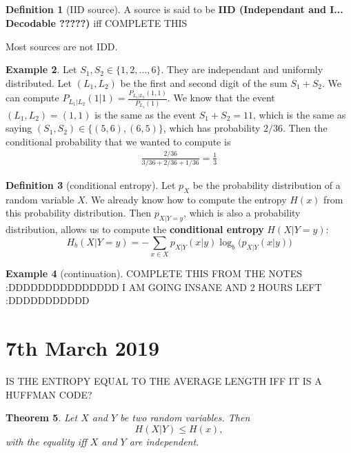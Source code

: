 \documentclass{report}
\theoremstyle{plain}
\newtheorem{thm}{Theorem}
\theoremstyle{definition}
\newtheorem{exmp}[thm]{Example}
\newtheorem{defn}[thm]{Definition}
\theoremstyle{remark}
\begin{document}
\subsection{}

\begin{defn}[IID source]
	A source is said to be \textbf{IID (Independant and I... Decodable ?????)} iff COMPLETE THIS
\end{defn}
Most sources are not IDD.

\begin{exmp}
	Let $S_1, S_2 \in \{1, 2, \ldots, 6\}$. They are independant and uniformly distributed. Let $(L_1, L_2)$ be the first and second digit of the sum $S_1 + S_2$. We can compute $P_{L_1 | L_2} (1|1) = \frac{P_{L_1 | L_2}(1, 1)}{P_{L_1}(1)}$. We know that the event $(L_1, L_2) = (1, 1)$ is the same as the event $S_1 + S_2 = 11$, which is the same as saying $(S_1, S_2) \in \{(5, 6), (6, 5)\}$, which has probability $2/36$. Then the conditional probability that we wanted to compute is
	\begin{align*}
		\frac{2/36}{3/36 + 2/36 + 1/36} = \frac13
	\end{align*}
\end{exmp}

\begin{defn}[conditional entropy]
	Let $p_X$ be the probability distribution of a random variable $X$. We already know how to compute the entropy $H(x)$ from this probability distribution. Then $p_{X|Y=y}$, which is also a probability distribution, allows us to compute the \textbf{conditional entropy} $H(X|Y=y)$:
	\begin{equation}
		H_b(X|Y=y) = - \sum_{x \in X} p_{X|Y}(x|y) \log_b \bigl(p_{X|Y}(x|y)\bigr)
	\end{equation} 	
\end{defn}

\begin{exmp}[continuation]
COMPLETE THIS FROM THE NOTES :DDDDDDDDDDDDDDD I AM GOING INSANE AND 2 HOURS LEFT :DDDDDDDDDDD
\end{exmp}

\section{7th March 2019}

IS THE ENTROPY EQUAL TO THE AVERAGE LENGTH IFF IT IS A HUFFMAN CODE?

\begin{thm}
	Let $X$ and $Y$ be two random variables. Then
	\begin{equation}
		H(X|Y) \leq H(x),
	\end{equation}
	with the equality iff $X$ and $Y$ are independent.
\end{thm}
\end{document}
